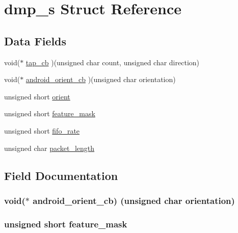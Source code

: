 \hypertarget{structdmp__s}{}\section{dmp\+\_\+s Struct Reference}
\label{structdmp__s}
\subsection*{Data Fields}
\begin{DoxyCompactItemize}
\item 
void($\ast$ \hyperlink{structdmp__s_a45a59366dd83331a3ae376edeb5b9e94}{tap\+\_\+cb} )(unsigned char count, unsigned char direction)
\item 
void($\ast$ \hyperlink{structdmp__s_a4ae9e6ba505d73d0db861f6ca28c1a3a}{android\+\_\+orient\+\_\+cb} )(unsigned char orientation)
\item 
unsigned short \hyperlink{structdmp__s_ac949b11ebfe17c3a2ac42785a1437c25}{orient}
\item 
unsigned short \hyperlink{structdmp__s_ac1c048fa56b613b3223d2e66ac2c050f}{feature\+\_\+mask}
\item 
unsigned short \hyperlink{structdmp__s_a4aec83107ddc0d95ddf30cce1b7e6465}{fifo\+\_\+rate}
\item 
unsigned char \hyperlink{structdmp__s_a6423143ff761c75d97f34c8465393ea0}{packet\+\_\+length}
\end{DoxyCompactItemize}


\subsection{Field Documentation}
\subsubsection[{\texorpdfstring{android\+\_\+orient\+\_\+cb}{android_orient_cb}}]{\setlength{\rightskip}{0pt plus 5cm}void($\ast$ android\+\_\+orient\+\_\+cb) (unsigned char orientation)}\hypertarget{structdmp__s_a4ae9e6ba505d73d0db861f6ca28c1a3a}{}\label{structdmp__s_a4ae9e6ba505d73d0db861f6ca28c1a3a}
\subsubsection[{\texorpdfstring{feature\+\_\+mask}{feature_mask}}]{\setlength{\rightskip}{0pt plus 5cm}unsigned short feature\+\_\+mask}\hypertarget{structdmp__s_ac1c048fa56b613b3223d2e66ac2c050f}{}\label{structdmp__s_ac1c048fa56b613b3223d2e66ac2c050f}
